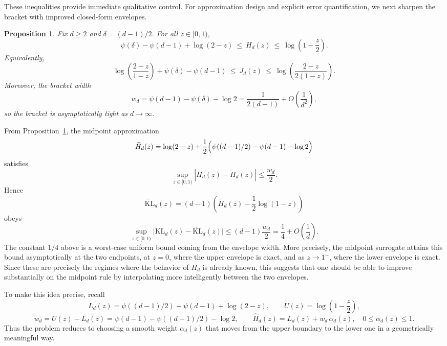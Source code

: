 \documentclass{article}
\newtheorem{prop}{Proposition}
\begin{document}
These inequalities provide immediate qualitative control. For approximation design and explicit error quantification, we next sharpen the bracket with improved closed-form envelopes.

\begin{prop}\label{p:Hd-refined}
Fix \(d\ge 2\) and \(\delta=(d-1)/2\). For all \(z\in[0,1)\),
\[
\psi(\delta)-\psi(d-1)+\log(2-z)
\ \le\ H_d(z)\ \le\ \log\left(1-\frac{z}{2}\right).
\]
Equivalently,
\[
\log\left(\frac{2-z}{1-z}\right)+\psi(\delta)-\psi(d-1)
\ \le\ J_d(z)\ \le\ \log\left(\frac{2-z}{2(1-z)}\right).
\]
Moreover, the bracket width
\[
w_d=\psi(d-1)-\psi(\delta)-\log 2
=\frac{1}{2(d-1)}+O\!\left(\frac{1}{d^2}\right),
\]
so the bracket is asymptotically tight as \(d\to\infty\).
\end{prop}

From Proposition~\ref{p:Hd-refined}, the midpoint approximation
\[
\widetilde H_d(z)=\log(2-z)+\frac{1}{2}\Bigl(\psi((d-1)/2)-\psi(d-1)-\log 2\Bigr)
\]
satisfies
\[
\sup_{z\in[0,1)}|H_d(z)-\widetilde H_d(z)|\le \frac{w_d}{2}.
\]
Hence
\[
\widetilde{\mathrm{KL}}_d(z)=(d-1)\left(\widetilde H_d(z)-\frac{1}{2}\log(1-z)\right)
\]
obeys
\[
\sup_{z\in[0,1)}\bigl|\mathrm{KL}_d(z)-\widetilde{\mathrm{KL}}_d(z)\bigr|
\le (d-1)\frac{w_d}{2} = \frac{1}{4}+O\!\left(\frac{1}{d}\right).
\]
The constant \(1/4\) above is a worst-case uniform bound coming from the envelope width.
More precisely, the midpoint surrogate attains this bound asymptotically at the two endpoints, at \(z=0\), where the upper envelope is exact, and as \(z\to 1^-\), where the lower envelope is exact.
Since these are precisely the regimes where the behavior of \(H_d\) is already known, this suggests that one
should be able to improve substantially on the midpoint rule by interpolating more intelligently between the two envelopes.

To make this idea precise, recall
\[
L_d(z)=\psi((d-1)/2)-\psi(d-1)+\log(2-z),
\qquad
U(z)=\log\left(1-\frac{z}{2}\right),
\]
\[
w_d=U(z)-L_d(z)=\psi(d-1)-\psi((d-1)/2)-\log 2,
\qquad
\widehat H_d(z)=L_d(z)+w_d\,\alpha_d(z),\quad 0\le \alpha_d(z)\le 1.
\]
Thus the problem reduces to choosing a smooth weight \(\alpha_d(z)\) that moves from the upper boundary
to the lower one in a geometrically meaningful way.
\end{document}
